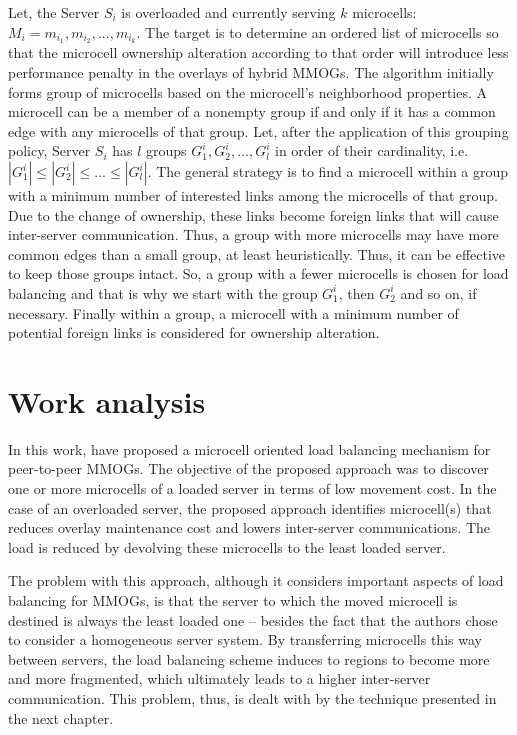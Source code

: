 Let, the Server $S_i$ is overloaded and currently serving $k$ microcells: $M_i = {m_{i_1} ,m_{i_2} , ..., m_{i_k}}$. The target is to determine an ordered list of microcells so that the microcell ownership alteration according to that order will introduce less performance penalty in the overlays of hybrid MMOGs. The algorithm initially forms group of microcells based on the microcell's neighborhood properties. A microcell can be a member of a nonempty group if and only if it has a common edge with any microcells of that group. Let, after the application of this grouping policy, Server $S_i$ has $l$ groups $G^i_1, G^i_2, ..., G^i_l$ in order of their cardinality, i.e. $|G^i_1| \leq |G^i_2| \leq ... \leq |G^i_l|$. The general strategy is to find a microcell within a group with a minimum number of interested links among the microcells of that group. Due to the change of ownership, these links become foreign links that will cause inter-server communication. Thus, a group with more microcells may have more common edges than a small group, at least heuristically. Thus, it can be effective to keep those groups intact. So, a group with a fewer microcells is chosen for load balancing and that is why we start with the group $G^i_1$, then $G^i_2$ and so on, if necessary. Finally within a group, a microcell with a minimum number of potential foreign links is considered for ownership alteration.



\section{Work analysis}

In this work, \cite{ahmed2008mol} have proposed a microcell oriented load balancing mechanism for peer-to-peer MMOGs. The objective of the proposed approach was to discover one or more microcells of a loaded server in terms of low movement cost. In the case of an overloaded server, the proposed approach identifies microcell(s) that reduces overlay maintenance cost and lowers inter-server communications. The load is reduced by devolving these microcells to the least loaded server.

The problem with this approach, although it considers important aspects of load balancing for MMOGs, is that the server to which the moved microcell is destined is always the least loaded one -- besides the fact that the authors chose to consider a homogeneous server system. By transferring microcells this way between servers, the load balancing scheme induces to regions to become more and more fragmented, which ultimately leads to a higher inter-server communication. This problem, thus, is dealt with by the technique presented in the next chapter.